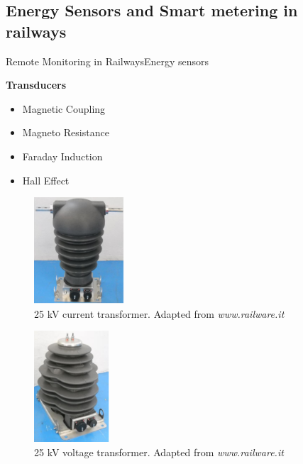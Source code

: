 \subsection{Energy Sensors and Smart metering in railways}

\begin{frame}{Remote Monitoring in Railways}{Energy sensors}
	\begin{block}{\textbf{Transducers}}
	
	\begin{minipage}[t]{0.48\linewidth}
		\vspace{5em}
	\begin{itemize}
		\item Magnetic Coupling
		\item Magneto Resistance
		\item Faraday Induction
		\item Hall Effect
	\end{itemize}
	\end{minipage}\hfill
	\begin{minipage}[t]{0.48\linewidth}
		
		
		\begin{figure}[ht!]
			\centering
			\includegraphics[width=0.30\textwidth,keepaspectratio]{figures/32.EnergyS/current_t}
			\caption{25 kV current transformer. Adapted from \textit{www.railware.it}}
		\end{figure}
		
			\begin{figure}[ht!]
			\centering
			\vspace{-3em}
			\includegraphics[width=0.25\textwidth,keepaspectratio]{figures/32.EnergyS/voltage_t}
			\caption{25 kV voltage transformer. Adapted from \textit{www.railware.it}}
		\end{figure}
		
		
	\end{minipage}
	

		
	\end{block}
\end{frame}
